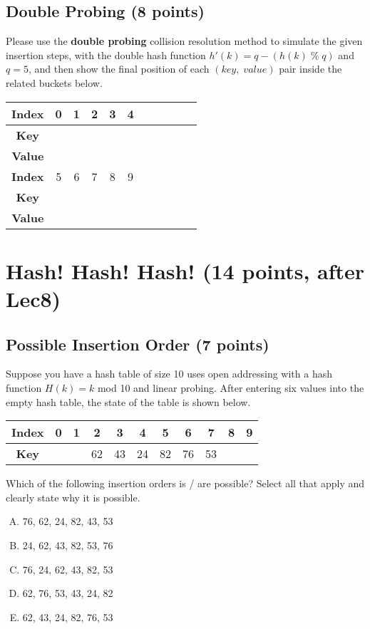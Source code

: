 \documentclass[11pt]{exam}
\begin{document}
\subsection{Double Probing (8 points)}
Please use the \textbf{double probing} collision resolution method to simulate the given insertion steps, with the double hash function $h'(k) = q - (h(k) \;\%\; q)$ and $q=5$, and then show the final position of each $(key,\;value)$ pair inside the related buckets below.
\begin{solution}
\begin{table}[H]
\centering
\renewcommand{\arraystretch}{2}
\setlength{\tabcolsep}{11mm}
\begin{tabular}{|c|c|c|c|c|c|c|c|c|c|c|}
\hline
\textbf{Index}&0&1&2&3&4\\
\hline
\textbf{Key}&&&&&\\
\hline
\textbf{Value}&&&&&\\
\hline
\textbf{Index}&5&6&7&8&9\\
\hline
\textbf{Key}&&&&&\\
\hline
\textbf{Value}&&&&&\\
\hline
\end{tabular}
\end{table}
\end{solution}
\section{Hash! Hash! Hash! (14 points, after Lec8)}

\subsection{Possible Insertion Order (7 points)}
Suppose you have a hash table of size 10 uses open addressing with a hash function $H(k) = k$ mod 10 and linear probing. After entering six values into the empty hash table, the state of the table is shown below.

\begin{table}[H]
\centering
\setlength{\tabcolsep}{5.5mm}
\begin{tabular}{|c|c|c|c|c|c|c|c|c|c|c|}
\hline
\textbf{Index}&0&1&2&3&4&5&6&7&8&9\\
\hline
\textbf{Key}&&&62&43&24&82&76&53&&\\
\hline
\end{tabular}
\end{table}
Which of the following insertion orders is / are possible? Select all that apply and clearly state why it is possible.
\begin{enumerate}[A.]
\item 76, 62, 24, 82, 43, 53
\item 24, 62, 43, 82, 53, 76
\item 76, 24, 62, 43, 82, 53
\item 62, 76, 53, 43, 24, 82
\item 62, 43, 24, 82, 76, 53
\end{enumerate}
\end{document}
